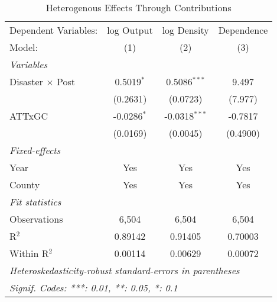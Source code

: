 
\begin{table}[htbp]
   \caption{Heterogenous Effects Through Contributions}
   \centering
   \begin{adjustbox}{max width = \textwidth, center}
      \begin{tabular}{lccc}
         \tabularnewline \midrule \midrule
         Dependent Variables:    & log Output    & log Density     & Dependence\\  
         Model:                  & (1)           & (2)             & (3)\\  
         \midrule
         \emph{Variables}\\
         Disaster $\times$ Post  & 0.5019$^{*}$  & 0.5086$^{***}$  & 9.497\\   
                                 & (0.2631)      & (0.0723)        & (7.977)\\   
         ATTxGC                  & -0.0286$^{*}$ & -0.0318$^{***}$ & -0.7817\\   
                                 & (0.0169)      & (0.0045)        & (0.4900)\\   
         \midrule
         \emph{Fixed-effects}\\
         Year                    & Yes           & Yes             & Yes\\  
         County                  & Yes           & Yes             & Yes\\  
         \midrule
         \emph{Fit statistics}\\
         Observations            & 6,504         & 6,504           & 6,504\\  
         R$^2$                   & 0.89142       & 0.91405         & 0.70003\\  
         Within R$^2$            & 0.00114       & 0.00629         & 0.00072\\  
         \midrule \midrule
         \multicolumn{4}{l}{\emph{Heteroskedasticity-robust standard-errors in parentheses}}\\
         \multicolumn{4}{l}{\emph{Signif. Codes: ***: 0.01, **: 0.05, *: 0.1}}\\
      \end{tabular}
   \end{adjustbox}
\end{table}


